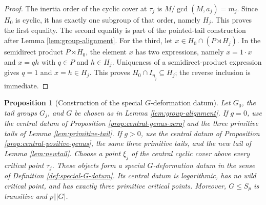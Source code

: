 \documentclass[10pt,a4paper]{amsart}
\newtheorem{proposition}[theorem]{Proposition}
\numberwithin{equation}{section}
\begin{document}
\begin{proof}
The inertia order of the cyclic cover at $\tau_j$ is
$M/\gcd(M,a_j)=m_j$.  Since $H_0$ is cyclic, it has exactly one subgroup of
that order, namely $H_j$.  This proves the first equality.  The second
equality is part of the pointed-tail construction after Lemma
\ref{lem:group-alignment}.  For the third, let
$x\in H_0\cap(P\rtimes H_j)$.  In the semidirect product
$P\rtimes H_0$, the element $x$ has two expressions, namely $x=1\cdot x$
and $x=q h$ with $q\in P$ and $h\in H_j$.  Uniqueness of a
semidirect-product expression gives $q=1$ and $x=h\in H_j$.  This proves
$H_0\cap I_{\eta_j}\subseteq H_j$; the reverse inclusion is immediate.

\end{proof}

\begin{proposition}[Construction of the special $G$-deformation datum]
\label{prop:assembled-special-datum}
Let $G_0$, the tail groups $G_j$, and $G$ be chosen as in Lemma
\ref{lem:group-alignment}.  If $g=0$, use the central datum of Proposition
\ref{prop:central-genus-zero} and the three primitive tails of Lemma
\ref{lem:primitive-tail}.  If $g>0$, use the central datum of Proposition
\ref{prop:central-positive-genus}, the same three primitive tails, and the
new tail of Lemma \ref{lem:newtail}.  Choose a point $\xi_j$ of the central
cyclic cover above every critical point $\tau_j$.  These objects form a
special $G$-deformation datum in the sense of Definition
\ref{def:special-G-datum}.  Its central datum is logarithmic, has no wild
critical point, and has exactly three primitive critical points.  Moreover,
$G\leq S_p$ is transitive and $p\Vert |G|$.
\end{proposition}
\end{document}
